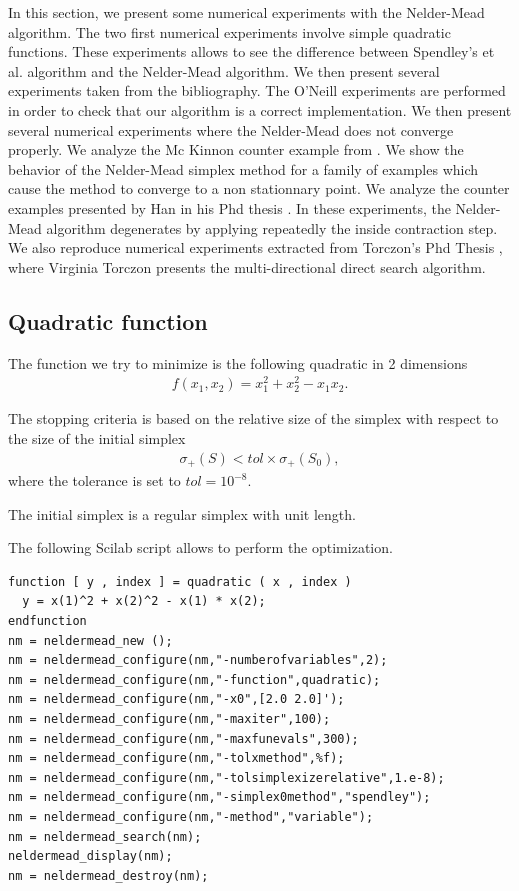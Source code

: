 In this section, we present some numerical experiments 
with the Nelder-Mead algorithm.
The two first numerical experiments involve simple quadratic functions.
These experiments allows to see the difference between
Spendley's et al. algorithm and the Nelder-Mead algorithm.
We then present several experiments taken from the bibliography.
The O'Neill experiments \cite{O'Neill1971AAF} are performed in order 
to check that our algorithm is a correct implementation.
We then present several numerical experiments where the Nelder-Mead
does not converge properly.
We analyze the Mc Kinnon counter example 
from \cite{589109}. We show the behavior of the 
Nelder-Mead simplex method for a family of examples which cause the 
method to converge to a non stationnary point.
We analyze the counter examples presented by Han in his Phd thesis \cite{Han2000}.
In these experiments, the Nelder-Mead algorithm degenerates by applying repeatedly
the inside contraction step.
We also reproduce numerical experiments extracted from Torczon's Phd Thesis 
\cite{Torczon89multi-directionalsearch}, where Virginia Torczon 
presents the multi-directional direct search algorithm. 

\subsection{Quadratic function}

The function we try to minimize is the following quadratic 
in 2 dimensions 
\begin{eqnarray}
f(x_1,x_2) = x_1^2 + x_2^2 - x_1 x_2.
\end{eqnarray}

The stopping criteria is based on the relative size of the simplex 
with respect to the size of the initial simplex 
\begin{eqnarray}
\sigma_+(S) < tol \times \sigma_+(S_0),
\end{eqnarray}
where the tolerance is set to $tol=10^{-8}$.

The initial simplex is a regular simplex with unit length.

The following Scilab script allows to perform the optimization.

\lstset{language=scilabscript}
\begin{lstlisting}
function [ y , index ] = quadratic ( x , index )
  y = x(1)^2 + x(2)^2 - x(1) * x(2);
endfunction
nm = neldermead_new ();
nm = neldermead_configure(nm,"-numberofvariables",2);
nm = neldermead_configure(nm,"-function",quadratic);
nm = neldermead_configure(nm,"-x0",[2.0 2.0]');
nm = neldermead_configure(nm,"-maxiter",100);
nm = neldermead_configure(nm,"-maxfunevals",300);
nm = neldermead_configure(nm,"-tolxmethod",%f);
nm = neldermead_configure(nm,"-tolsimplexizerelative",1.e-8);
nm = neldermead_configure(nm,"-simplex0method","spendley");
nm = neldermead_configure(nm,"-method","variable");
nm = neldermead_search(nm);
neldermead_display(nm);
nm = neldermead_destroy(nm);
\end{lstlisting}

